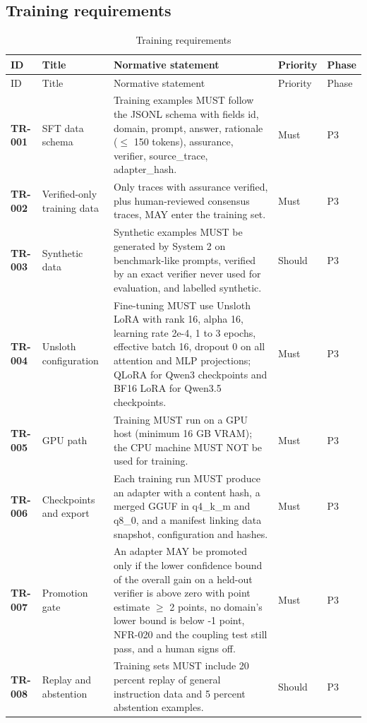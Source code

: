 \subsection{Training requirements}
\begin{longtable}{@{}p{1.45cm}p{2.5cm}p{8.1cm}p{1.6cm}p{1.1cm}@{}}
\caption{Training requirements}\\
\toprule ID & Title & Normative statement & Priority & Phase\\\midrule\endfirsthead
\toprule ID & Title & Normative statement & Priority & Phase\\\midrule\endhead
\bottomrule\endfoot
\textbf{TR-001} & SFT data schema & Training examples MUST follow the JSONL schema with fields id, domain, prompt, answer, rationale ($\le$ 150 tokens), assurance, verifier, source\_trace, adapter\_hash. & Must & P3\\
\textbf{TR-002} & Verified-only training data & Only traces with assurance verified, plus human-reviewed consensus traces, MAY enter the training set. & Must & P3\\
\textbf{TR-003} & Synthetic data & Synthetic examples MUST be generated by System 2 on benchmark-like prompts, verified by an exact verifier never used for evaluation, and labelled synthetic. & Should & P3\\
\textbf{TR-004} & Unsloth configuration & Fine-tuning MUST use Unsloth LoRA with rank 16, alpha 16, learning rate 2e-4, 1 to 3 epochs, effective batch 16, dropout 0 on all attention and MLP projections; QLoRA for Qwen3 checkpoints and BF16 LoRA for Qwen3.5 checkpoints. & Must & P3\\
\textbf{TR-005} & GPU path & Training MUST run on a GPU host (minimum 16 GB VRAM); the CPU machine MUST NOT be used for training. & Must & P3\\
\textbf{TR-006} & Checkpoints and export & Each training run MUST produce an adapter with a content hash, a merged GGUF in q4\_k\_m and q8\_0, and a manifest linking data snapshot, configuration and hashes. & Must & P3\\
\textbf{TR-007} & Promotion gate & An adapter MAY be promoted only if the lower confidence bound of the overall gain on a held-out verifier is above zero with point estimate $\ge$ 2 points, no domain's lower bound is below -1 point, NFR-020 and the coupling test still pass, and a human signs off. & Must & P3\\
\textbf{TR-008} & Replay and abstention & Training sets MUST include 20 percent replay of general instruction data and 5 percent abstention examples. & Should & P3\\
\end{longtable}

